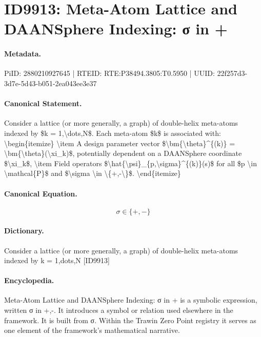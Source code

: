 \section*{ID9913: Meta-Atom Lattice and DAANSphere Indexing: σ in +}
\paragraph{Metadata.}
PiID: 2880210927645 | RTEID: RTE:P38494.3805:T0.5950 | UUID: 22f257d3-3d7e-5d43-b051-2ea043ee3e37

\paragraph{Canonical Statement.}
Consider a lattice (or more generally, a graph) of double-helix meta-atoms indexed by \$k = 1,\textbackslash{}dots,N\$. Each meta-atom \$k\$ is associated with: \textbackslash{}begin\{itemize\} \textbackslash{}item A design parameter vector \$\textbackslash{}bm\{\textbackslash{}theta\}\textasciicircum{}\{(k)\} = \textbackslash{}bm\{\textbackslash{}theta\}(\textbackslash{}xi\_k)\$, potentially dependent on a DAANSphere coordinate \$\textbackslash{}xi\_k\$, \textbackslash{}item Field operators \$\textbackslash{}hat\{\textbackslash{}psi\}\_\{p,\textbackslash{}sigma\}\textasciicircum{}\{(k)\}(s)\$ for all \$p \textbackslash{}in \textbackslash{}mathcal\{P\}\$ and \$\textbackslash{}sigma \textbackslash{}in \textbackslash{}\{+,-\textbackslash{}\}\$. \textbackslash{}end\{itemize\}

\paragraph{Canonical Equation.}
\[
\sigma \in \{+,-\}
\]

\paragraph{Dictionary.}
Consider a lattice (or more generally, a graph) of double-helix meta-atoms indexed by k = 1,dots,N [ID9913]

\paragraph{Encyclopedia.}
Meta-Atom Lattice and DAANSphere Indexing: σ in + is a symbolic expression, written σ in +,-. It introduces a symbol or relation used elsewhere in the framework. It is built from σ. Within the Trawin Zero Point registry it serves as one element of the framework's mathematical narrative.
